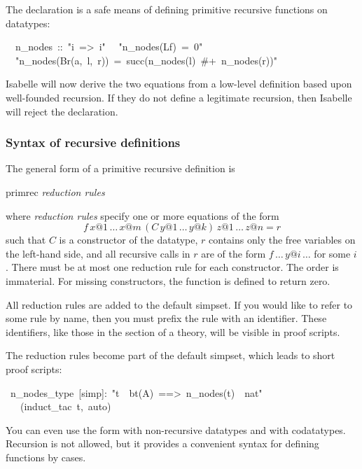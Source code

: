 The  declaration is a safe means of defining primitive
recursive functions on datatypes:
\begin{isabelle}
\ \ n\_nodes\ ::\ "i\ =>\ i"\isanewline
{}\isanewline
\ \ "n\_nodes(Lf)\ =\ 0"\isanewline
\ \ "n\_nodes(Br(a,\ l,\ r))\ =\ succ(n\_nodes(l)\ \#+\ n\_nodes(r))"
\end{isabelle}
Isabelle will now derive the two equations from a low-level definition  
based upon well-founded recursion.  If they do not define a legitimate
recursion, then Isabelle will reject the declaration.


\subsubsection{Syntax of recursive definitions}

The general form of a primitive recursive definition is
\begin{ttbox}\isastyleminor
primrec
    {\it reduction rules}
\end{ttbox}
where \textit{reduction rules} specify one or more equations of the form
\[ f \, x@1 \, \dots \, x@m \, (C \, y@1 \, \dots \, y@k) \, z@1 \,
\dots \, z@n = r \] such that $C$ is a constructor of the datatype, $r$
contains only the free variables on the left-hand side, and all recursive
calls in $r$ are of the form $f \, \dots \, y@i \, \dots$ for some $i$.  
There must be at most one reduction rule for each constructor.  The order is
immaterial.  For missing constructors, the function is defined to return zero.

All reduction rules are added to the default simpset.
If you would like to refer to some rule by name, then you must prefix
the rule with an identifier.  These identifiers, like those in the
 section of a theory, will be visible in proof scripts.

The reduction rules become part of the default simpset, which
leads to short proof scripts:
\begin{isabelle}
\ n\_nodes\_type\ [simp]:\ "t\ \isasymin \ bt(A)\ ==>\ n\_nodes(t)\ \isasymin \ nat"\isanewline
\ \ \ (induct\_tac\ t,\ auto)
\end{isabelle}

You can even use the  form with non-recursive datatypes and
with codatatypes.  Recursion is not allowed, but it provides a convenient
syntax for defining functions by cases.


